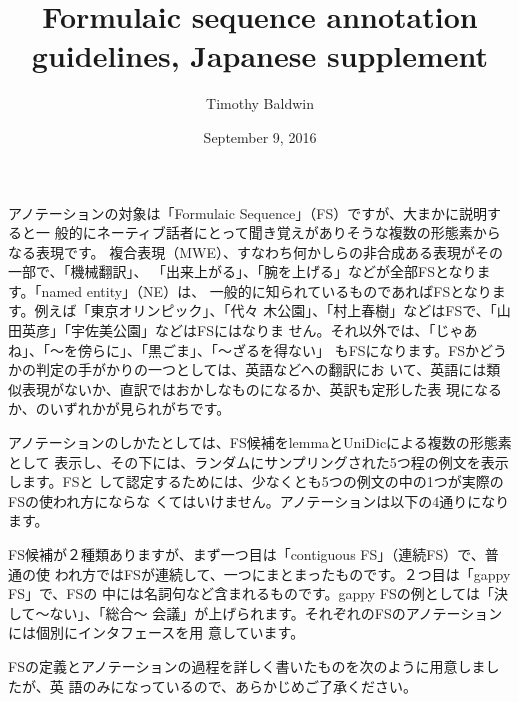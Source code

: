 \documentclass[12pt,letterpaper]{article}
\title{Formulaic sequence annotation guidelines, Japanese supplement}
\author{Timothy Baldwin}
\date{September 9, 2016}
\begin{document}
\maketitle

\begin{CJK*}{UTF8}{min}
アノテーションの対象は「Formulaic Sequence」（FS）ですが、大まかに説明すると一
般的にネーティブ話者にとって聞き覚えがありそうな複数の形態素からなる表現です。
複合表現（MWE）、すなわち何かしらの非合成ある表現がその一部で、「機械翻訳」、
「出来上がる」、「腕を上げる」などが全部FSとなります。「named entity」（NE）は、
一般的に知られているものであればFSとなります。例えば「東京オリンピック」、「代々
木公園」、「村上春樹」などはFSで、「山田英彦」「宇佐美公園」などはFSにはなりま
せん。それ以外では、「じゃあね」、「〜を傍らに」、「黒ごま」、「〜ざるを得ない」
もFSになります。FSかどうかの判定の手がかりの一つとしては、英語などへの翻訳にお
いて、英語には類似表現がないか、直訳ではおかしなものになるか、英訳も定形した表
現になるか、のいずれかが見られがちです。
\end{CJK*} 

\begin{CJK*}{UTF8}{min}
アノテーションのしかたとしては、FS候補をlemmaとUniDicによる複数の形態素として
表示し、その下には、ランダムにサンプリングされた5つ程の例文を表示します。FSと
して認定するためには、少なくとも5つの例文の中の1つが実際のFSの使われ方にならな
くてはいけません。アノテーションは以下の4通りになります。
\end{CJK*} 


\begin{CJK*}{UTF8}{min}
FS候補が２種類ありますが、まず一つ目は「contiguous FS」（連続FS）で、普通の使
われ方ではFSが連続して、一つにまとまったものです。２つ目は「gappy FS」で、FSの
中には名詞句など含まれるものです。gappy FSの例としては「決して〜ない」、「総合～
会議」が上げられます。それぞれのFSのアノテーションには個別にインタフェースを用
意しています。
\end{CJK*}

\begin{CJK*}{UTF8}{min}
FSの定義とアノテーションの過程を詳しく書いたものを次のように用意しましたが、英
語のみになっているので、あらかじめご了承ください。
\end{CJK*}
\end{document}
